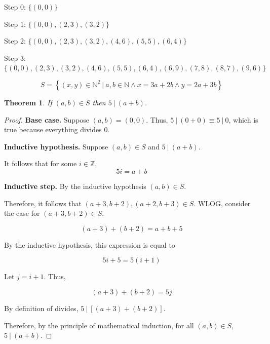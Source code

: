 \documentclass{article}
\newtheorem{theorem}{Theorem}
\numberwithin{subcase}{case}
\begin{document}
\begin{outline}[enumerate]
    \1 
        \2 Step 0: $\{(0, 0)\}$
        
        Step 1: $\{(0, 0), (2, 3), (3, 2)\}$
    
        Step 2: $\{(0, 0), (2, 3), (3, 2), (4, 6), (5, 5), (6, 4)\}$
    
        Step 3: $\{(0, 0), (2, 3), (3, 2), (4, 6), (5, 5), (6, 4), (6, 9), (7, 8), (8, 7), (9, 6)\}$

        \2 $$S = \left\{ (x, y) \in \mathbb{N}^2\ |\ a, b \in \mathbb{N} \wedge x = 3a + 2b \wedge y = 2a + 3b \right\}$$

        \2 \begin{theorem}
            If $(a, b) \in S$ then $5\ |\ (a + b)$.
        \end{theorem}

        \begin{proof}
            \textbf{Base case.} Suppose $(a, b) = (0, 0)$. Thus, $5\ |\ (0 + 0) \equiv 5\ |\ 0$, which is 
            true because everything divides $0$.

            \textbf{Inductive hypothesis.} Suppose $(a, b) \in S$ and $5\ |\ (a + b)$. 

            It follows that for some $i \in \mathbb{Z}$, 
            \begin{equation}
                5i = a + b
            \end{equation}

            \textbf{Inductive step.} 
            By the inductive hypothesis $(a, b) \in S$.
            
            Therefore, it follows that $(a + 3, b + 2),(a + 2, b + 3) \in S$. WLOG, consider 
            the case for $(a + 3, b + 2) \in S$.

            $$(a + 3) + (b + 2) = a + b + 5$$

            By the inductive hypothesis, this expression is equal to 

            $$5i + 5 = 5(i + 1)$$

            Let $j = i + 1$. Thus, 

            $$(a + 3) + (b + 2) = 5j$$

            By definition of divides, $5\ |\ \left[(a + 3) + (b + 2)\right]$.

            Therefore, by the principle of mathematical induction, for all $(a, b) \in S$, 
            $5\ |\ (a + b)$. 
        \end{proof}
    
\end{outline} 
\end{document}
